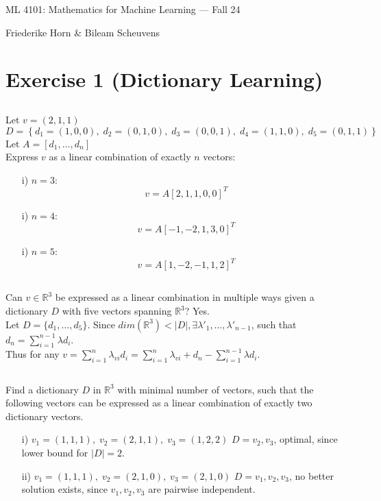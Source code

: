 \documentclass[10pt]{article}
\numberwithin{equation}{section}
\begin{document}
\begin{center}
    \sc ML 4101: Mathematics for Machine Learning --- Fall 24
\end{center}

\noindent Friederike Horn \& Bileam Scheuvens

\section{Exercise 1 (Dictionary Learning)}

\subsection{}
Let $v = (2, 1, 1)$
$$D = \left\{
d_1 = (1, 0, 0),\; d_2 = (0, 1, 0),\; d_3 = (0, 0, 1),\; d_4 = (1, 1, 0),\; d_5 = (0, 1, 1)
\right\}$$
Let $A = [d_1,\dots, d_n]$\\
Express $v$ as a linear combination of exactly $n$ vectors:
\begin{enumerate}
  \item[i)]{$n=3$: $$v = A [2,1,1,0,0]^T $$}
  \item[i)]{$n=4$: $$v = A [-1,-2,1,3,0]^T $$}
  \item[i)]{$n=5$: $$v = A [1,-2,-1,1,2]^T $$}
\end{enumerate}

\subsection{}
Can $v \in \mathbb{R}^3$ be expressed as a linear combination in multiple ways given a dictionary $D$ with five vectors spanning $\mathbb{R}^3$?
Yes.\\
Let $D = \{d_1, \dots, d_5\}$. Since $dim(\mathbb{R}^3) < |D|, \exists \lambda'_1, \dots, \lambda'_{n-1}$, such that $d_n = \sum_{i=1}^{n-1} \lambda d_i$.\\
Thus for any $v = \sum_{i=1}^n \lambda_{vi} d_i = \sum_{i=1}^n \lambda_{vi} + d_n - \sum_{i=1}^{n-1} \lambda d_i$.\\

\subsection{}
Find a dictionary $D$ in $\mathbb{R}^3$ with minimal number of vectors, such that the following vectors can be expressed as a linear combination of exactly two dictionary vectors.


\begin{enumerate}
  \item[i)]{
      $v_1 = (1,1,1),\; v_2 = (2,1,1),\; v_3 = (1,2,2)$
      $D = {v_2,v_3}$, optimal, since lower bound for $|D| = 2$.
    }
  \item[ii)]{
      $v_1 = (1,1,1),\; v_2 = (2,1,0),\; v_3 = (2,1,0)$
      $D = {v_1, v_2, v_3}$, no better solution exists, since $v_1, v_2, v_3$ are pairwise independent.
    }
\end{enumerate}
\end{document}
